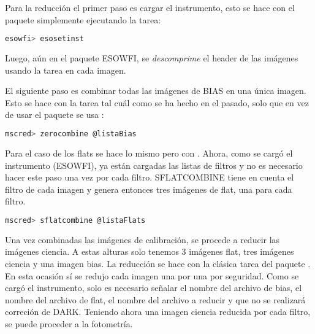 \documentclass[12pt]{article}
\begin{document}
Para la reducción el primer paso es cargar el instrumento, esto se hace con el paquete  simplemente ejecutando la tarea:
\begin{lstlisting}[language=bash]
 esowfi> esosetinst
\end{lstlisting}

Luego, aún en el paquete ESOWFI, se \emph{descomprime} el header de las imágenes usando la tarea  en cada imagen.

El siguiente paso es combinar todas las imágenes de BIAS en una única imagen. Esto se hace con la tarea  tal cuál como se ha hecho en el pasado, solo que en vez de usar el paquete  se usa  :
\begin{lstlisting}[language=bash]
 mscred> zerocombine @listaBias
\end{lstlisting}
Para el caso de los flats se hace lo mismo pero con .
Ahora, como se cargó el instrumento (ESOWFI), ya están cargadas las listas de filtros y no es necesario hacer este paso una vez por cada filtro. SFLATCOMBINE tiene en cuenta el filtro de cada imagen y genera entonces tres imágenes de flat, una para cada filtro.
\begin{lstlisting}[language=bash]
 mscred> sflatcombine @listaFlats
\end{lstlisting}

Una vez combinadas las imágenes de calibración, se procede a reducir las imágenes ciencia. A estas alturas solo tenemos 3 imágenes flat, tres imágenes ciencia y una imagen bias. La reducción se hace con la clásica tarea del paquete . En esta ocasión sí se redujo cada imagen una por una por seguridad. Como se cargó el instrumento, solo es necesario señalar el nombre del archivo de bias, el nombre del archivo de flat, el nombre del archivo a reducir y que no se realizará correción de DARK. Teniendo ahora una imagen ciencia reducida por cada filtro, se puede proceder a la fotometría.
\end{document}
